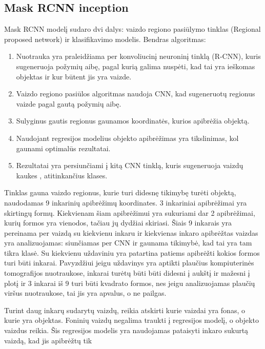 \documentclass{VUMIFInfKursinis}
\begin{document}
\subsection{Mask RCNN inception}
\par
Mask RCNN modelį sudaro dvi dalys: vaizdo regiono pasiūlymo tinklas (Regional proposed network) ir
klasifikavimo modelis. \cite{salt14} Bendras algoritmas:
\begin{enumerate}
\item Nuotrauka yra praleidžiama per konvoliucinį neuroninį tinklą (R-CNN), kuris
sugeneruoja požymių aibę, pagal kurią galima nuspėti, kad tai yra ieškomas objektas
ir kur būtent jis yra vaizde.
\item Vaizdo regiono pasiūlos algoritmas naudoja CNN, kad sugeneruotų regionus vaizde pagal
gautą požymių aibę.
\item Sulyginus gautis regionus gaunamos koordinatės, kurios apibrėžia objektą.
\item Naudojant regresijos modelius objekto apibrėžimas yra tikslinimas, kol gaunami
optimalūs rezultatai.
\item Rezultatai yra persiunčiami į kitą CNN tinklą, kuris sugeneruoja vaizdų kaukes
, atitinkančius klases.
\end{enumerate}
\par
Tinklas gauna vaizdo regionus, kurie turi didesnę tikimybę turėti objektą, naudodamas
9 inkarinių apibrėžimų koordinates.
3 inkariniai apibrėžimai yra skirtingų formų. Kiekvienam šiam apibrėžimui yra sukuriami
dar 2 apibrėžimai, kurių formos yra vienodos, tačiau jų dydžiai skiriasi. Šiais 9
inkarais yra pereinama per vaizdą su kiekvienu inkaru ir kiekvienas inkaro apibrėžtas
vaizdas yra analizuojamas: siunčiamas per CNN ir gaunama tikimybė, kad tai yra tam tikra
klasė. Su kiekvienu uždaviniu yra patartina patiems apibrėžti kokios formos turi būti inkarai. \cite{salt15}
Pavyzdžiui jeigu uždavinys yra aptikti plaučius kompiuterinės tomografijos nuotraukose,
inkarai turėtų būti būti didesni į aukštį ir mažesni į plotį ir 3 inkarai iš 9 turi būti
kvadrato formos, nes jeigu analizuojamas plaučių viršus nuotraukose, tai jis yra apvalus,
o ne pailgas.
\par
Turint daug inkarų sudarytų vaizdų, reikia atskirti kurie vaizdai yra fonas, o kurie
yra objektas. Foninių vaizdų negalima traukti į regresijos modelį, o objekto vaizdus reikia.
Šis regresijos modelis yra naudojamas pataisyti inkaro sukurtą vaizdą, kad jis apibrėžtų tik
\end{document}
